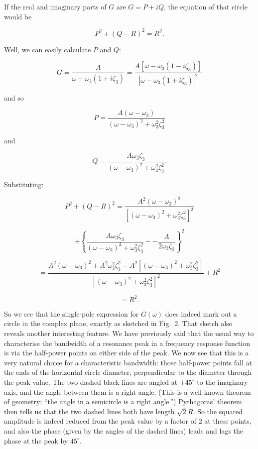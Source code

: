   If the real and imaginary parts of $G$ are $G=P+iQ$, the equation of that 
  circle would be 

  $$P^2 + (Q-R)^2 = R^2. \tag{22}$$ 

  Well, we can easily calculate $P$ and $Q$: 

  
  $$G=\dfrac{A}{\omega-\omega_3(1+i\zeta_3)}=\dfrac{A[\omega-\omega_3(1-i\zeta_3)]}{|\omega-\omega_3(1+i\zeta_3)|^2} 
  \tag{23}$$ 

  and so 

  $$P=\dfrac{A(\omega-\omega_3)}{(\omega-\omega_3)^2 + \omega_3^2 \zeta_3^2} 
  \tag{24}$$ 

  and 

  $$Q=\dfrac{A\omega_3\zeta_3}{(\omega-\omega_3)^2 + \omega_3^2 \zeta_3^2} . 
  \tag{25}$$ 

  Substituting: 

  $$P^2 + (Q-R)^2 = \dfrac{A^2(\omega-\omega_3)^2}{[(\omega-\omega_3)^2 + 
  \omega_3^2 \zeta_3^2]^2}$$ 

  $$+ \left\lbrace \dfrac{A\omega_3\zeta_3}{(\omega-\omega_3)^2 + \omega_3^2 
  \zeta_3^2} -- \dfrac{A}{2 \omega_3 \zeta_3} \right\rbrace^2 $$ 

  $$=\dfrac{A^2(\omega-\omega_3)^2 + A^2 \omega_3^2 \zeta_3^2-A^2 
  [(\omega-\omega_3)^2 + \omega_3^2 \zeta_3^2]}{[(\omega-\omega_3)^2 + 
  \omega_3^2 \zeta_3^2]^2}+R^2$$ 

  $$=R^2. \tag{26}$$ 

  So we see that the single-pole expression for $G(\omega)$ does indeed mark 
  out a circle in the complex plane, exactly as sketched in Fig.\ 2. That 
  sketch also reveals another interesting feature. We have previously said that 
  the usual way to characterise the bandwidth of a resonance peak in a 
  frequency response function is via the half-power points on either side of 
  the peak. We now see that this is a very natural choice for a characteristic 
  bandwidth: those half-power points fall at the ends of the horizontal circle 
  diameter, perpendicular to the diameter through the peak value. The two 
  dashed black lines are angled at $\pm45^\circ$ to the imaginary axis, and the 
  angle between them is a right angle. (This is a well-known theorem of 
  geometry: ``the angle in a semicircle is a right angle.'') Pythagoras' 
  theorem then tells us that the two dashed lines both have length $\sqrt{2}R$. 
  So the squared amplitude is indeed reduced from the peak value by a factor of 
  2 at these points, and also the phase (given by the angles of the dashed 
  lines) leads and lags the phase at the peak by $45^\circ$. 


